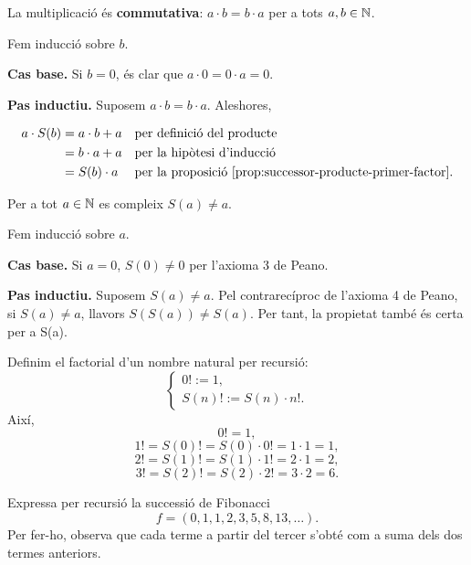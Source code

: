 \begin{proposicio}
La multiplicació és \textbf{commutativa}: $a\cdot b=b\cdot a$ per a tots $a,b\in \mathbb{N}$.
\end{proposicio}

\begin{prova}
Fem inducció sobre $b$.

\textbf{Cas base.} Si $b=0$, és clar que $a\cdot 0=0\cdot a=0$.

\textbf{Pas inductiu.} Suposem $a\cdot b=b\cdot a$. Aleshores,

\begin{align*}
a\cdot S(b) 
&= a\cdot b+a 
&& \text{per definició del producte} \\
&= b\cdot a+a 
&& \text{per la hipòtesi d'inducció} \\
&= S(b)\cdot a 
&& \text{per la proposició~\ref{prop:successor-producte-primer-factor}}.
\end{align*}
\end{prova}

\begin{exemple}
Per a tot $a\in \mathbb{N}$ es compleix $S(a)\neq a$.
\end{exemple}

\begin{solucio}
Fem inducció sobre $a$.

\textbf{Cas base.} Si $a=0$, $S(0)\neq 0$ per l'axioma 3 de Peano.

\textbf{Pas inductiu.} Suposem $S(a)\neq a$. Pel contrarecíproc de l'axioma 4 de Peano, si $S(a)\neq a$, llavors $S(S(a))\neq S(a)$. Per tant, la propietat també és certa per a S(a).
\end{solucio}

\begin{exemple}[El factorial]
Definim el factorial d'un nombre natural per recursió:
\[
\left\{
\begin{array}{l}
0!:=1, \\
S(n)!:=S(n)\cdot n!.
\end{array}
\right.
\]
Així,
\[
0!=1,
\]
\[
1!=S(0)!=S(0)\cdot 0!=1\cdot 1=1,
\]
\[
2!=S(1)!=S(1)\cdot 1!=2\cdot 1=2,
\]
\[
3!=S(2)!=S(2)\cdot 2!=3\cdot 2=6.
\]
\end{exemple}

\begin{exemple}
Expressa per recursió la successió de Fibonacci
\[
f=(0,1,1,2,3,5,8,13,\ldots).
\]
Per fer-ho, observa que cada terme a partir del tercer s'obté com a suma dels dos termes anteriors.
\end{exemple}

